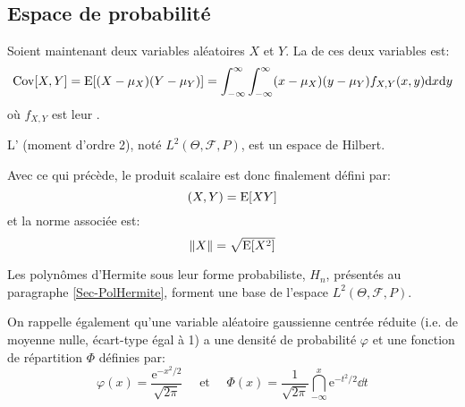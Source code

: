 \medskip
\subsection{Espace de probabilité}

Soient maintenant deux variables aléatoires $X$ et $Y$.
La  de ces deux variables est:
\begin{equation}
\operatorname{Cov}[X,Y]=\operatorname{E}[(X-\mu_X)(Y-\mu_Y)]=\displaystyle\int_{-\infty}^\infty\displaystyle\int_{-\infty}^\infty(x-\mu_X)(y-\mu_Y)f_{X,Y}(x,y)\text{d} x\text{d} y
\end{equation}
où $f_{X,Y}$ est leur .

\medskip
\begin{definition}
L' (moment d'ordre 2), noté $L^2(\Theta,\mathcal{F},P)$, est un espace de Hilbert.

Avec ce qui précède, le produit scalaire est donc finalement défini par:
\begin{equation}\label{Eq_StoPS}
(X,Y)=\operatorname{E}[XY]
\end{equation}
et la norme associée est:
\begin{equation}
\|X\|=\sqrt{\operatorname{E}[X^2]}
\end{equation}
\end{definition}

\begin{theoreme}
Les polynômes d'Hermite sous leur forme probabiliste, $H_n$, présentés au paragraphe \ref{Sec-PolHermite}, forment une base de l'espace $L^2(\Theta,\mathcal{F},P)$.
\end{theoreme}

On rappelle également qu'une variable aléatoire gaussienne centrée réduite (i.e. de moyenne nulle, écart-type égal à 1) a une densité de probabilité $\varphi$ et une fonction de répartition $\Phi$ définies par:
\begin{equation}
\varphi(x) =\frac{\mathrm{e}^{-x^2/2}}{\sqrt{2\pi}} \quad \text{ et } \quad
\Phi(x) = \dfrac1{\sqrt{2\pi}}\dint_{-\infty}^x \mathrm{e}^{-t^2/2} \dd t
\end{equation}

